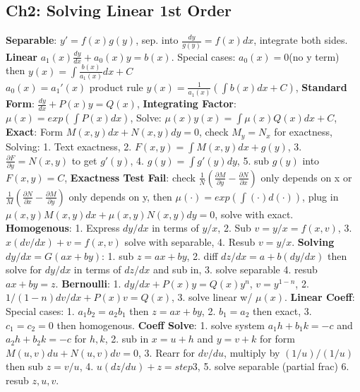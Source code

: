 \subsection*{Ch2: Solving Linear 1st Order}
\textbf{Separable}: $y' = f(x)g(y)$, sep. into $\frac{dy}{g(y)} = f(x)dx$, integrate both sides. \\
\textbf{Linear} $a_1(x)\frac{dy}{dx} + a_0(x)y = b(x)$. Special cases: $a_0(x) = 0$(no y term) then $y(x) = \int \frac{b(x)}{a_1(x)}dx + C$ \\
$a_0(x) = a_1'(x)$ product rule $y(x) = \frac{1}{a_1(x)}(\int b(x)dx + C)$, 
\textbf{Standard Form}: $\frac{dy}{dx} + P(x)y = Q(x)$, \textbf{Integrating Factor}: $\mu(x) = exp(\int P(x)dx)$, 
Solve: $\mu(x)y(x) = \int \mu(x)Q(x)dx + C$, \textbf{Exact}: Form $M(x,y)dx + N(x,y)dy = 0$, check $M_y = N_x$ for exactness, 
Solving: 
1. Text exactness, 
2. $F(x,y) = \int M(x,y)dx + g(y)$, 
3. $\frac{\partial F}{\partial y} = N(x,y)$ to get $g'(y)$,
4. $g(y) = \int g'(y)dy$,
5. sub $g(y)$ into $F(x,y) = C$, 
\textbf{Exactness Test Fail}: check $\frac{1}{N}(\frac{\partial M}{\partial y} - \frac{\partial N}{\partial x})$ only depends on x 
or $\frac{1}{M}(\frac{\partial N}{\partial x} - \frac{\partial M}{\partial y})$ only depends on y, then $\mu(\cdot) = exp(\int (\cdot) d(\cdot))$,
plug in $\mu(x,y)M(x,y)dx + \mu(x,y)N(x,y)dy = 0$, solve with exact. 
\textbf{Homogenous}:
1. Express $dy/dx$ in terms of $y/x$, 
2. Sub $v = y/x = f(x,v)$, 
3. $x(dv/dx) + v = f(x,v)$ solve with separable,
4. Resub $v = y/x$. 
\textbf{Solving $dy/dx = G(ax + by)$}: 
1. sub $z= ax + by$, 
2. diff $dz/dx = a + b(dy/dx)$ then solve for $dy/dx$ in terms of $dz/dx$ and sub in, 
3. solve separable
4. resub $ax + by = z$. 
\textbf{Bernoulli}: 
1. $dy/dx + P(x)y = Q(x)y^n$, $v = y^{1-n}$, 
2. $1/(1-n)dv/dx + P(x)v = Q(x)$, 
3. solve linear w/ $\mu(x)$. 
\textbf{Linear Coeff}: 
Special cases: 
1. $a_1b_2 = a_2b_1$ then $z = ax+by$, 
2. $b_1 = a_2$ then exact, 
3. $c_1 = c_2 = 0$ then homogenous. 
\textbf{Coeff Solve}: 
1. solve system $a_1h + b_1k = -c$ and $a_2h + b_2k = -c$ for $h, k$, 
2. sub in $x = u + h$ and $y = v + k$ for form $M(u, v)du + N(u, v)dv = 0$,
3. Rearr for $dv/du$, multiply by $(1/u)/(1/u)$ then sub $z = v/u$,
4. $u(dz/du) + z = step3$, 
5. solve separable (partial frac)
6. resub $z, u, v$.

